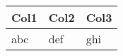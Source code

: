 \documentclass{article}
\begin{document}
\begin{longtable}{@{}lll@{}}
\toprule
Col1 & Col2 & Col3 \\
\midrule
\endhead
abc & def & ghi \\
\bottomrule
\end{longtable}
\end{document}
